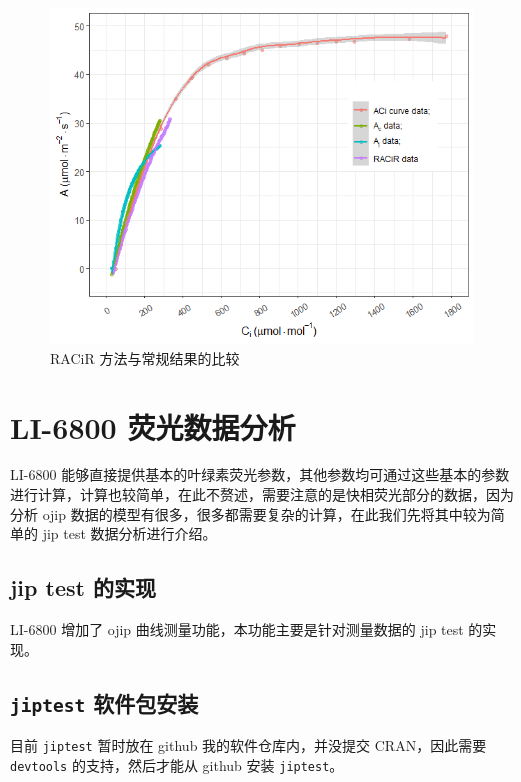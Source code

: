 \documentclass[]{krantz}
\theoremstyle{definition}
\theoremstyle{definition}
\theoremstyle{definition}
\theoremstyle{remark}
\begin{document}
\begin{figure}
\includegraphics[width=1\linewidth]{images/racir} \caption{RACiR 方法与常规结果的比较}\label{fig:racir}
\end{figure}

\section{LI-6800 荧光数据分析}\label{fluro68}

LI-6800
能够直接提供基本的叶绿素荧光参数，其他参数均可通过这些基本的参数进行计算，计算也较简单，在此不赘述，需要注意的是快相荧光部分的数据，因为分析
ojip 数据的模型有很多，很多都需要复杂的计算，在此我们先将其中较为简单的
jip test 数据分析进行介绍。

\subsection{jip test 的实现}\label{jiptest}

LI-6800 增加了 ojip 曲线测量功能，本功能主要是针对测量数据的 jip test
的实现。

\subsection{\texorpdfstring{\texttt{jiptest}
软件包安装}{jiptest 软件包安装}}\label{jiptest_pack}

目前 \texttt{jiptest} 暂时放在 github 我的软件仓库内，并没提交
CRAN，因此需要 \texttt{devtools} 的支持，然后才能从 github 安装
\texttt{jiptest}。
\end{document}
